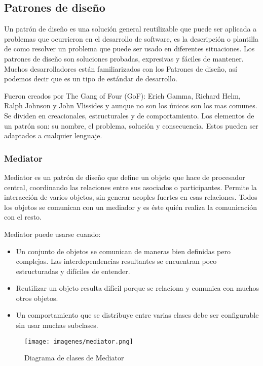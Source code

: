 \documentclass[12pt]{article}
\begin{document}
\subsection{Patrones de diseño}
Un patrón de diseño es una solución general reutilizable que puede ser aplicada a problemas que ocurrieron en el desarrollo de software, es la descripción o plantilla de como resolver un problema que puede ser usado en diferentes situaciones. Los patrones de diseño son soluciones probadas, expresivas y fáciles de mantener. Muchos desarrolladores están familiarizados con los Patrones de diseño, así podemos decir que es un tipo de estándar de desarrollo. 

\par Fueron creados por The Gang of Four (GoF): Erich Gamma, Richard Helm, Ralph Johnson y John Vlissides y aunque no son los únicos son los mas comunes. Se dividen en creacionales, estructurales y de comportamiento. Los elementos de un patrón son: su nombre, el problema, solución y consecuencia. Estos pueden ser adaptados a cualquier lenguaje. 

\subsubsection{Mediator}
Mediator es un patrón de diseño que define un objeto que hace de procesador central, coordinando las relaciones entre sus asociados o participantes. Permite la interacción de varios objetos, sin generar acoples fuertes en esas relaciones. Todos los objetos se comunican con un mediador y es éste quién realiza la comunicación con el resto. 

\par Mediator puede usarse cuando:

\renewcommand{\labelitemi}{$\bullet$}
\begin{itemize}
\item Un conjunto de objetos se comunican de maneras bien definidas pero complejas. Las interdependencias resultantes se encuentran poco estructuradas y difíciles de entender.
\item Reutilizar un objeto resulta difícil porque se relaciona y comunica con muchos otros objetos.
\item Un comportamiento que se distribuye entre varias clases debe ser configurable sin usar muchas subclases.
\end{itemize}

\begin{figure}[H]
\centering
\texttt{[image: imagenes/mediator.png]}
\caption{Diagrama de clases de Mediator}
\end{figure} 
\end{document}
